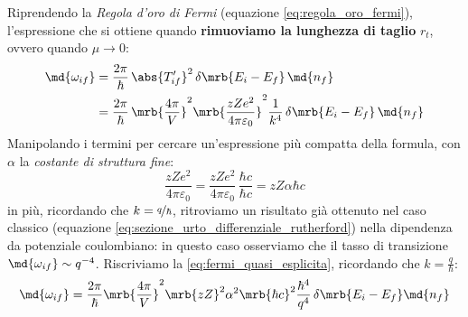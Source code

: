 Riprendendo la \textit{Regola d'oro di Fermi} (equazione
\ref{eq:regola_oro_fermi}), l'espressione che si ottiene quando
\textbf{rimuoviamo la lunghezza di taglio} $r_t$, ovvero quando $\mu \to 0$: 
\begin{equation}
  \begin{split}
    \md{\omega_{if}} 
    & = \frac{2\pi}{\hbar} \, \abs{T_{if}^\prime}^2 \, \delta\mrb{E_i - E_f}
    \, \md{n_f} \\
    & = \frac{2\pi}{\hbar} \, \mrb{\frac{4\pi}{V}}^2
    \mrb{\frac{zZe^2}{4\pi\varepsilon_0}}^2 \frac{1}{k^4} \,
    \delta\mrb{E_i - E_f} \, \md{n_f}
  \end{split}
  \label{eq:fermi_quasi_esplicita}
\end{equation}
Manipolando i termini per cercare un'espressione più compatta della formula,
con $\alpha$ la \textit{costante di struttura fine}:
\begin{equation}
  \frac{zZe^2}{4\pi\varepsilon_0} = \frac{zZe^2}{4\pi\varepsilon_0} \,
  \frac{\hbar c}{\hbar c} = zZ \alpha \hbar c
\end{equation}
in più, ricordando che $k = \nicefrac{q}{\hbar}$, ritroviamo un risultato già
ottenuto nel caso classico (equazione
\ref{eq:sezione_urto_differenziale_rutherford}) nella dipendenza da potenziale
coulombiano: in questo caso osserviamo che il tasso di transizione
$\md{\omega_{if}} \sim q^{-4}$.  
Riscriviamo la \ref{eq:fermi_quasi_esplicita}, ricordando che $k =
\frac{q}{\hbar}$:
\begin{equation}
  \md{\omega_{if}} = \frac{2\pi}{\hbar} \mrb{\frac{4\pi}{V}}^2 \mrb{zZ}^2
  \alpha^2 \mrb{\hbar c}^2 \frac{\hbar^4}{q^4} \, \delta\mrb{E_i - E_f}
  \md{n_f}
\end{equation}
